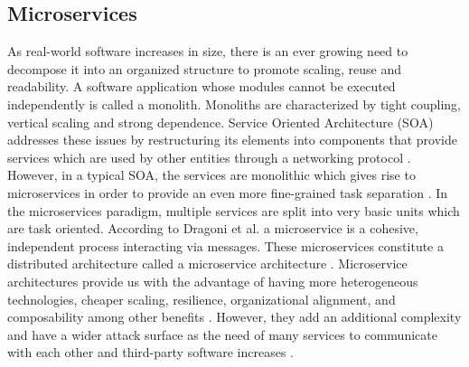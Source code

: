\subsection{Microservices}
\label{chap:microservices}


As real-world software increases in size, there is an ever growing need to decompose it into an organized structure to promote scaling, reuse and readability. A software application whose modules cannot be executed independently is called a monolith. Monoliths are characterized by tight coupling, vertical scaling and strong dependence. Service Oriented Architecture (SOA) addresses these issues by restructuring its elements into components that provide services which are used by other entities through a networking protocol \cite{papazoglou2003service}. However, in a typical SOA, the services are monolithic which gives rise to microservices in order to provide an even more fine-grained task separation \cite{ahmadvand2016requirements}.
In the microservices paradigm, multiple services are split into very basic units which are task oriented. According to Dragoni et al. a microservice is a cohesive, independent process interacting via messages. These microservices constitute a distributed architecture called a microservice architecture \cite{dragoni2017microservices}. Microservice architectures provide us with the advantage of having more heterogeneous technologies, cheaper scaling, resilience, organizational alignment, and composability among other benefits \cite{newman2015building}. However, they add an additional complexity and have a wider attack surface as the need of many services to communicate with each other and third-party software increases \cite{combe2016docker, dragoni2017microservices}. 

